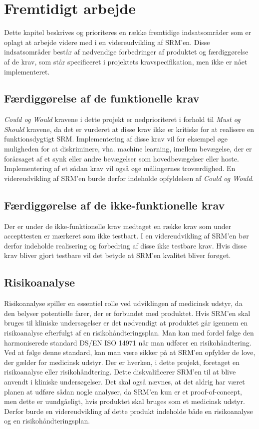 \chapter{Fremtidigt arbejde}

Dette kapitel beskrives og prioriteres en række fremtidige indsatsområder som er oplagt at arbejde videre med i en videreudvikling af SRM'en. Disse indsatsområder består af nødvendige forbedringer af produktet og færdiggørelse af de krav, som står specificeret i projektets kravspecifikation, men ikke er nået implementeret.  


\section{Færdiggørelse af de funktionelle krav}
\textit{Could og Would} kravene i dette projekt er nedprioriteret i forhold til \textit{Must og Should} kravene, da det er vurderet at disse krav ikke er kritiske for at realisere en funktionsdygtigt SRM. Implementering af disse krav vil for eksempel øge muligheden for at diskriminere, vha. machine learning, imellem bevægelse, der er forårsaget af et synk eller andre bevægelser som hovedbevægelser eller hoste. Implementering af et sådan krav vil også øge målingernes troværdighed. En videreudvikling af SRM'en burde derfor indeholde opfyldelsen af \textit{Could og Would}.   

\section{Færdiggørelse af de ikke-funktionelle krav}
Der er under de ikke-funktionelle krav medtaget en række krav som under accepttesten er mærkeret som ikke testbart. I en videreudvikling af SRM'en bør derfor indeholde realisering og forbedring af disse ikke testbare krav. Hvis disse krav bliver gjort testbare vil det betyde at SRM'en kvalitet bliver forøget.    

\section{Risikoanalyse}
 Risikoanalyse spiller en essentiel rolle ved udviklingen af medicinsk udstyr, da den belyser potentielle farer, der er forbundet med produktet. Hvis SRM'en skal bruges til kliniske undersøgelser er det nødvendigt at produktet går igennem en risikoanalyse efterfulgt af en risikohåndteringsplan. Man kan med fordel følge den harmoniserede standard DS/EN ISO 14971 når man udfører en risikohåndtering. Ved at følge denne standard, kan man være sikker på at SRM'en opfylder de love, der gælder for medicinsk udstyr. Der er hverken, i dette projekt, foretaget en risikoanalyse eller risikohåndtering. Dette diskvalificerer SRM'en til at blive anvendt i kliniske undersøgelser. Det skal også nævnes, at det aldrig har været planen at udføre sådan nogle analyser, da SRM'en kun er et proof-of-concept, men dette er uundgåeligt, hvis produktet skal bruges som et medicinsk udstyr. Derfor burde en videreudvikling af dette produkt indeholde både en risikoanalyse og en risikohåndteringsplan.    
 
